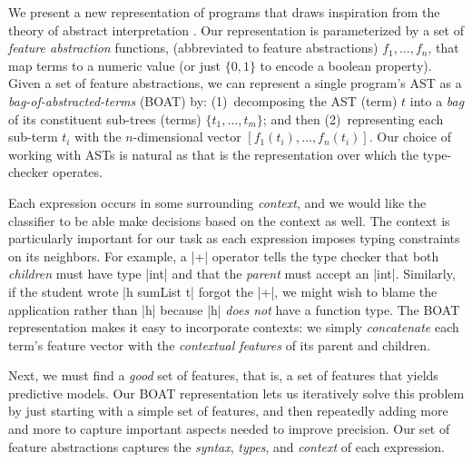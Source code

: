%
We present a new representation of programs
that draws inspiration from the theory of
abstract interpretation \citep{Cousot1977-xs}.
%
Our representation is parameterized by a
set of \emph{feature abstraction} functions,
(abbreviated to feature abstractions)
$f_1, \ldots, f_n$, that map terms to a
numeric value (or just $\{0, 1\}$ to
encode a boolean property).
%
Given a set of feature abstractions, we
can represent a single program's AST as
a \emph{bag-of-abstracted-terms} (BOAT)
by:
%
(1)~decomposing the AST (term) $t$ into
    a \emph{bag} of its constituent sub-trees
    (terms) $\{t_1,\ldots,t_m\}$; and then
%
(2)~representing each sub-term $t_i$
    with the $n$-dimensional
    vector $[f_1(t_i),\ldots, f_n(t_i)]$.
%
Our choice of working with ASTs is natural
as that is the representation over which the
type-checker operates.



%
Each expression occurs in some surrounding
\emph{context}, and we would like the
classifier to be able make decisions based
on the context as well.
%
The context is particularly important
for our task as each expression
imposes typing constraints on its
neighbors.
%
For example, a |+| operator tells
the type checker that both \emph{children}
must have type |int| and that the \emph{parent}
must accept an |int|.
%
Similarly, if the student wrote
|h sumList t| \ie forgot the |+|,
we might wish to blame the application
rather than |h| because |h|
\emph{does not} have a function type.
%
The BOAT representation makes it
easy to incorporate contexts: we
simply \emph{concatenate} each
term's feature vector with the
\emph{contextual features} of
its parent and children.




Next, we must find a \emph{good}
set of features, that is, a set
of features that yields predictive
models. Our BOAT representation
lets us iteratively solve this
problem by just starting with
a simple set of features, and
then repeatedly adding more
and more to capture important
aspects needed to improve precision.
%
Our set of feature abstractions
captures the
\emph{syntax}, \emph{types}, and
\emph{context} of each expression.

